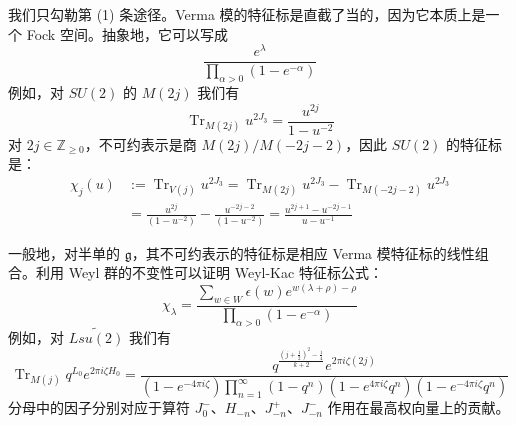 
我们只勾勒第 (1) 条途径。Verma 模的特征标是直截了当的，因为它本质上是一个 Fock 空间。抽象地，它可以写成
\begin{equation}
  \frac{e^{\lambda}}{\prod_{\alpha>0}(1-e^{-\alpha})}
  \tag{4.157}
  \label{eq:4.157}
\end{equation}
例如，对 $SU(2)$ 的 $M(2j)$ 我们有
\begin{equation}
  \operatorname{Tr}_{M(2j)}u^{2J_3}=\frac{u^{2j}}{1-u^{-2}}
  \tag{4.158}
  \label{eq:4.158}
\end{equation}
对 $2j\in\mathbb{Z}_{\ge0}$，不可约表示是商 $M(2j)/M(-2j-2)$，因此 $SU(2)$ 的特征标是：
\begin{equation}
\begin{aligned}
  \chi_j(u) &:=\operatorname{Tr}_{V(j)}u^{2J_3}
  =\operatorname{Tr}_{M(2j)}u^{2J_3}-\operatorname{Tr}_{M(-2j-2)}u^{2J_3}\\
  &=\frac{u^{2j}}{(1-u^{-2})}-\frac{u^{-2j-2}}{(1-u^{-2})}
  =\frac{u^{2j+1}-u^{-2j-1}}{u-u^{-1}}
\end{aligned}
  \tag{4.159}
  \label{eq:4.159}
\end{equation}

一般地，对半单的 $\mathfrak{g}$，其不可约表示的特征标是相应 Verma 模特征标的线性组合。利用 Weyl 群的不变性可以证明 Weyl-Kac 特征标公式：
\begin{equation}
  \chi_{\lambda}=\frac{\sum_{w\in W}\epsilon(w)e^{w(\lambda+\rho)-\rho}}{\prod_{\alpha>0}(1-e^{-\alpha})}
  \tag{4.160}
  \label{eq:4.160}
\end{equation}
例如，对 $\widetilde{Lsu(2)}$ 我们有
\begin{equation}
  \operatorname{Tr}_{M(j)}q^{L_0}e^{2\pi i\zeta H_0}
  =\frac{q^{\frac{(j+\frac12)^2-\frac14}{k+2}}e^{2\pi i\zeta(2j)}}
  {(1-e^{-4\pi i\zeta})\prod_{n=1}^{\infty}(1-q^{n})(1-e^{4\pi i\zeta}q^{n})(1-e^{-4\pi i\zeta}q^{n})}
  \tag{4.161}
  \label{eq:4.161}
\end{equation}
分母中的因子分别对应于算符 $J_0^-$、$H_{-n}$、$J_{-n}^+$、$J_{-n}^-$ 作用在最高权向量上的贡献。

